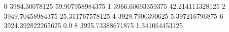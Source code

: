 0 3984.30078125 59.907958984375
1 3966.60693359375 42.214111328125
2 3949.70458984375 25.311767578125
4 3929.7900390625 5.397216796875
6 3924.392822265625 0.0
8 3925.73388671875 1.341064453125
